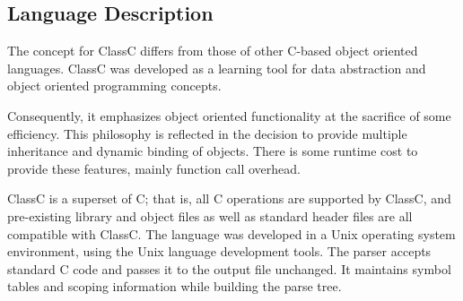 \subsection{Language Description}

The concept for ClassC differs from those of other C-based object oriented
languages.  ClassC was developed as a
learning tool for data abstraction and object oriented programming
concepts.

Consequently, it emphasizes object oriented functionality at the sacrifice of
some efficiency.  This philosophy is reflected in the decision to provide
multiple inheritance and dynamic binding of objects.  There is some runtime
cost to provide these features, mainly function call overhead.

ClassC is a superset of C; that is, all C operations are supported by
ClassC, and pre-existing library and object files as well as standard
header files are all compatible with ClassC.
The language was developed in a Unix operating system environment,
using the Unix language development tools.  The parser accepts
standard C code and passes it to the output file unchanged.
It maintains symbol tables and scoping information while building the
parse tree.

